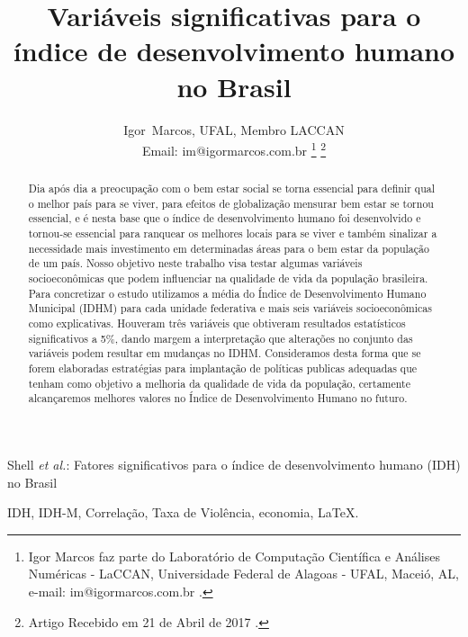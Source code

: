 \documentclass[journal]{IEEEtran}
\begin{document}
\title{Variáveis significativas para o índice de desenvolvimento humano no Brasil}
\author{Igor~Marcos, UFAL, Membro LACCAN\\
Email: im@igormarcos.com.br
\thanks{Igor Marcos faz parte do Laboratório de Computação Científica e Análises Numéricas - LaCCAN, Universidade Federal de Alagoas - UFAL, Maceió,
AL, e-mail: im@igormarcos.com.br .}
\thanks{Artigo Recebido em 21 de Abril de 2017%
.}}

{Shell \MakeLowercase{\textit{et al.}}: Fatores significativos para o índice de desenvolvimento humano (IDH) no Brasil}

\maketitle
\begin{abstract}
Dia após dia a preocupação com o bem estar social se torna essencial para definir qual o melhor país para se viver, para efeitos de globalização mensurar bem estar se tornou essencial, e é nesta base que o índice de desenvolvimento humano foi desenvolvido e tornou-se essencial para ranquear os melhores locais para se viver e também sinalizar a necessidade mais investimento em determinadas áreas para o bem estar da população de um país. Nosso objetivo neste trabalho visa testar algumas variáveis socioeconômicas que podem influenciar na qualidade de vida da população brasileira. Para concretizar o estudo utilizamos a média do Índice de Desenvolvimento Humano Municipal (IDHM) para cada unidade federativa e mais seis variáveis socioeconômicas como explicativas.
Houveram três variáveis que obtiveram resultados estatísticos significativos a 5\%, dando margem a interpretação que alterações no conjunto das variáveis podem resultar em mudanças no IDHM. Consideramos desta forma que se forem elaboradas estratégias para implantação de políticas publicas adequadas que tenham como objetivo a melhoria da qualidade de vida da população, certamente alcançaremos melhores valores no Índice de Desenvolvimento Humano no futuro.
\end{abstract}

\begin{IEEEkeywords}
IDH, IDH-M, Correlação, Taxa de Violência, economia, \LaTeX.
\end{IEEEkeywords}
\IEEEpeerreviewmaketitle
\end{document}
